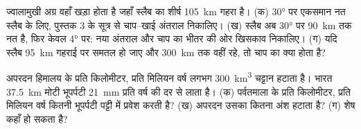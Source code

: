 \begin{exercise}[$\star\star\star$]\label{exo:b2:himalaya-andes:11}
ज्वालामुखी अग्र वहाँ खड़ा होता है जहाँ स्लैब का शीर्ष \qty{105}{km} गहरा है। (क)
\ang{30} पर एकसमान नत स्लैब के लिए, पुस्तक 3 के सूत्र से चाप--खाई अंतराल
निकालिए। (ख) स्लैब अब \ang{30} पर \qty{90}{km} तक नत है, फिर केवल \ang{4} पर:
नया अंतराल और चाप का भीतर की ओर खिसकाव निकालिए। (ग) यदि स्लैब
\qty{95}{km} गहराई पर समतल हो जाए और \qty{300}{km} तक वहीं रहे, तो चाप का क्या होता है?
\end{exercise}

\begin{exercise}[$\star\star\star$]\label{exo:b2:himalaya-andes:12}
अपरदन हिमालय के प्रति किलोमीटर, प्रति मिलियन वर्ष लगभग \qty{300}{km^3} चट्टान हटाता है।
भारत \qty{37.5}{km} मोटी भूपर्पटी \qty{21}{mm} प्रति वर्ष की दर से लाता है। (क) पर्वतमाला के प्रति
किलोमीटर, प्रति मिलियन वर्ष कितनी भूपर्पटी पट्टी में प्रवेश करती है? (ख) अपरदन उसका कितना अंश हटाता है?
(ग) शेष कहाँ हो सकता है?
\end{exercise}

